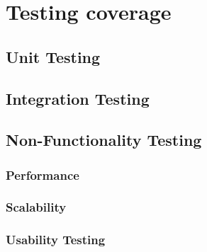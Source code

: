 \documentclass[12pt]{article}
\begin{document}
	\section{Testing coverage}	
			\subsection{Unit Testing}
			
			\subsection{Integration Testing}
				
			\subsection{Non-Functionality Testing}
			
				\subsubsection{Performance}
							
				\subsubsection{Scalability}
							
				\subsubsection{Usability Testing}	
\end{document}

